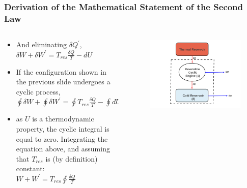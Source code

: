 \documentclass[10pt,compress]{beamer}
\begin{document}
\begin{frame}
 \frametitle{Derivation of the Mathematical Statement of the Second Law}
 \begin{columns}

  \begin{column}[c]{0.5\linewidth}
   \begin{itemize}
    \item <1-> And eliminating $\delta Q^{\prime}$, \\
                $\delta W + \delta W^{\prime} = T_{res}\displaystyle\frac{\delta Q}{T} - dU$
     \item <2-> If the configuration shown in the previous slide undergoes a cyclic process, \\
             $\displaystyle\oint \delta W + \displaystyle\oint \delta W^{\prime} = \displaystyle\oint T_{res}\displaystyle\frac{\delta Q}{T} - \displaystyle\oint dU$
     \item <3-> as $U$ is a thermodynamic property, the cyclic integral is equal to zero.  Integrating the equation above, and assuming that $T_{res}$ is (by definition) constant:\\
             $W + W^{\prime} = T_{res} \displaystyle\oint \displaystyle\frac{\delta Q}{T}$
   \end{itemize}
  \end{column}

  \begin{column}[c]{0.5\linewidth}
   \begin{figure}%
    \begin{center}
     \includegraphics[width=1.1\columnwidth,clip]{./Pics/2ndLaw_Schem2}
    \end{center}
   \end{figure} 
  \end{column}
 \end{columns}
 \normalsize
    
\end{frame}
\end{document}
